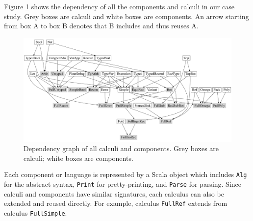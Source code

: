 
Figure \ref{fig:dependency} shows the
dependency of all the components and calculi in our case study. Grey
boxes are calculi and white boxes are components. An arrow starting
from box A to box B denotes that B includes and thus reuses A.

\begin{figure}
    \centering
    \includegraphics[width=\textwidth]{resources/depGraph.pdf}
    \caption{Dependency graph of all calculi and components. Grey boxes are calculi; white boxes are components.}
    \label{fig:dependency}
\end{figure}

Each component or language is represented by a Scala object which includes \lstinline{Alg}
for the abstract syntax, \lstinline{Print} for pretty-printing, and \lstinline{Parse} for parsing.
Since calculi and components have similar signatures, each calculus
can also be extended and reused directly. For example, calculus \lstinline{FullRef} extends from
calculus \lstinline{FullSimple}.





